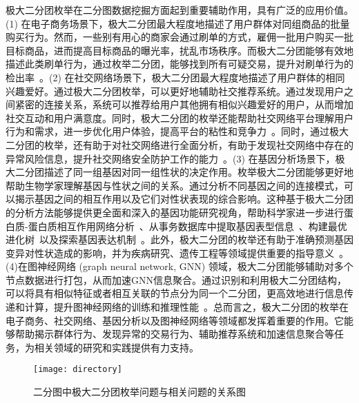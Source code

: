 极大二分团枚举在二分图数据挖掘方面起到重要辅助作用，具有广泛的应用价值。(1) 在电子商务场景下，极大二分团最大程度地描述了用户群体对同组商品的批量购买行为。然而，一些别有用心的商家会通过刷单的方式，雇佣一批用户购买一批目标商品，进而提高目标商品的曝光率，扰乱市场秩序。而极大二分团能够有效地描述此类刷单行为，通过枚举二分团，能够找到所有可疑交易，提升对刷单行为的检出率~\cite{clickfarm21,MEB20,MEB22}。(2) 在社交网络场景下，极大二分团最大程度地描述了用户群体的相同兴趣爱好。通过极大二分团枚举，可以更好地辅助社交推荐系统。通过发现用户之间紧密的连接关系，系统可以推荐给用户其他拥有相似兴趣爱好的用户，从而增加社交互动和用户满意度。同时，极大二分团的枚举还能帮助社交网络平台理解用户行为和需求，进一步优化用户体验，提高平台的粘性和竞争力~\cite{minel06}。同时，通过极大二分团的枚举，还有助于对社交网络进行全面分析，有助于发现社交网络中存在的异常风险信息，提升社交网络安全防护工作的能力~\cite{dangerous19,dangerous05}。(3) 在基因分析场景下，极大二分团描述了同一组基因对同一组性状的决定作用。枚举极大二分团能够更好地帮助生物学家理解基因与性状之间的关系。通过分析不同基因之间的连接模式，可以揭示基因之间的相互作用以及它们对性状表现的综合影响。这种基于极大二分团的分析方法能够提供更全面和深入的基因功能研究视角，帮助科学家进一步进行蛋白质-蛋白质相互作用网络分析~\cite{protein11}、从事务数据库中提取基因表型信息~\cite{gene11}、构建最优进化树~\cite{tree04}以及探索基因表达机制~\cite{geneexp11}。此外，极大二分团的枚举还有助于准确预测基因变异对性状造成的影响，并为疾病研究、遗传工程等领域提供重要的指导意义~\cite{gene22,iMBEA14,protein21}。(4)在图神经网络 (graph neural network, GNN) 领域，极大二分团能够辅助对多个节点数据进行打包，从而加速GNN信息聚合。通过识别和利用极大二分团结构，可以将具有相似特征或者相互关联的节点分为同一个二分团，更高效地进行信息传递和计算，提升图神经网络的训练和推理性能~\cite{PQ21}。总而言之，极大二分团的枚举在电子商务、社交网络、基因分析以及图神经网络等领域都发挥着重要的作用。它能够帮助揭示群体行为、发现异常的交易行为、辅助推荐系统和加速信息聚合等任务，为相关领域的研究和实践提供有力支持。

\begin{figure} [t]
  \centering
  \vspace{0.1in}
  \texttt{[image: directory]}
  \vspace{0.1in}
  \caption{二分图中极大二分团枚举问题与相关问题的关系图}
  \label{fig:directory}
\end{figure}

